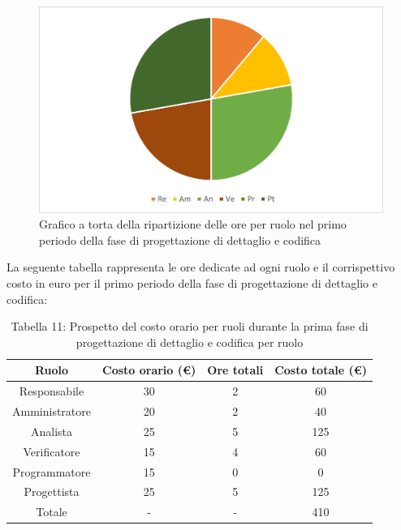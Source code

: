 \begin{figure}[H]
    \centering
    \includegraphics[scale=0.6]{img/grafi preventivo/torta/codifica/periodo1.png}
    \caption{Grafico a torta della ripartizione delle ore per ruolo nel primo periodo della fase di progettazione di dettaglio e codifica}
\end{figure}
La seguente tabella rappresenta le ore dedicate ad ogni ruolo e il corrispettivo costo in euro per il primo periodo della fase di progettazione di dettaglio e codifica:
\begin{table}[h]
	\setlength\extrarowheight{5pt}
	\centering
	\begin{tabularx}{\textwidth}{|ccc|c|}
		\hline
		\rowcolor{white}
		\textbf{Ruolo} & \textbf{Costo orario (€)} & \textbf{Ore totali} & \textbf{Costo totale (€)} \\
		\hline
		Responsabile &30&2&60 \\
		Amministratore &20&2&40 \\
		Analista &25&5&125 \\
		Verificatore &15&4&60 \\
		Programmatore &15&0&0 \\
		Progettista &25&5&125 \\
		\hline
		Totale &-&-&410 \\
		\hline
	\end{tabularx}
    \vspace{10pt}
	\caption{Tabella 11: Prospetto del costo orario per ruoli durante la prima fase di progettazione di dettaglio e codifica per ruolo}
\end{table}
%
